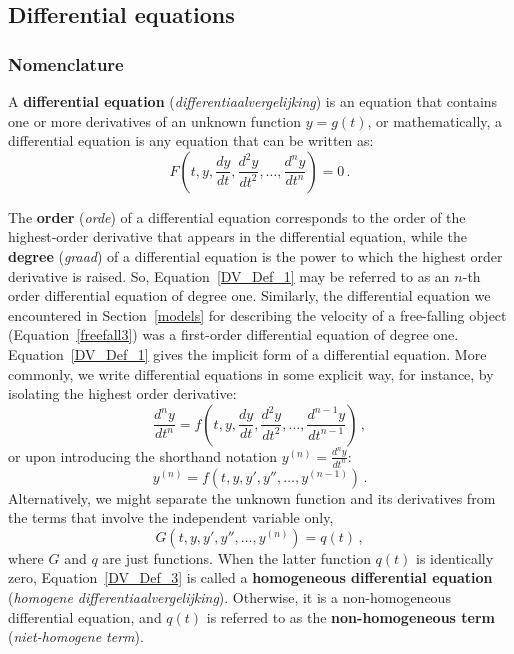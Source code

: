 \subsection{Differential equations}
\label{naamgeving}
\subsubsection{Nomenclature}

\begin{definition} 
A  \textbf{differential equation} (\textit{differentiaalvergelijking}) is an equation that contains one or more derivatives of an unknown function $y=g(t)$, or mathematically, a differential equation is any equation that can be written as:
\begin{equation}
F\left(t,y,\dfrac{d y}{d t},\dfrac{d^2 y}{d t^2},\ldots,\dfrac{d^n y}{d t^n}\right)=0\,.
\label{DV_Def_1}
\end{equation}
\end{definition}
The \textbf{order} (\textit{orde}) of a differential equation corresponds to the order of the highest-order derivative that appears in the differential equation, while the \textbf{degree} (\textit{graad}) of a differential equation is the power to which the highest order derivative is raised. So, Equation~\eqref{DV_Def_1} may be referred to as an $n$-th order differential equation of degree one. Similarly, the differential equation we encountered in Section~\ref{models} for describing the velocity of a free-falling object (Equation~\eqref{freefall3}) was a first-order differential equation of degree one. 
Equation~\eqref{DV_Def_1} gives the
implicit form of a differential equation. More commonly, we write differential equations in some explicit way, for instance, by isolating the highest order derivative:
$$
\dfrac{d^n y}{d t^n}=f\left(t,y,\dfrac{d y}{d t},\dfrac{d^2 y}{d t^2},\ldots,\dfrac{d^{n-1} y}{d t^{n-1}}\right)\,,
$$
or upon introducing the shorthand notation $y^{(n)}=\frac{d^n y}{d t^n}$:
\begin{equation}
y^{(n)}=f\left(t,y,y',y'',\ldots,y^{(n-1)}\right)\,.
\label{DV_Def_2}
\end{equation}
Alternatively, we might separate the unknown function and its derivatives from the terms that involve the independent variable only,
\begin{equation}
G\left(t,y,y',y'',\ldots,y^{(n)}\right)=q(t)\,, 
\label{DV_Def_3}
\end{equation}
where $G$ and $q$ are just functions. When the latter function $q(t)$ is identically zero, Equation~\eqref{DV_Def_3} is called a \textbf{homogeneous differential equation} (\textit{homogene differentiaalvergelijking}). Otherwise, it is a non-homogeneous differential equation, and $q(t)$ is referred to as the
\textbf{non-homogeneous term} (\textit{niet-homogene term}).

